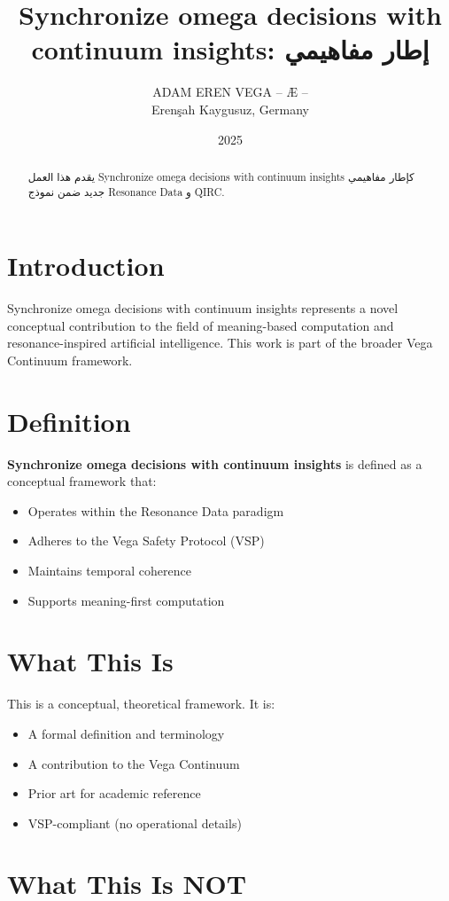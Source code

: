 \documentclass[12pt,a4paper]{article}
\title{Synchronize omega decisions with continuum insights: إطار مفاهيمي}
\author{ADAM EREN VEGA – Æ –\\\small{Erenşah Kaygusuz, Germany}}
\date{2025}
\begin{document}
\maketitle

\begin{abstract}
يقدم هذا العمل Synchronize omega decisions with continuum insights كإطار مفاهيمي جديد ضمن نموذج Resonance Data و QIRC.
\end{abstract}

\section{Introduction}

Synchronize omega decisions with continuum insights represents a novel conceptual contribution to the field of meaning-based computation and resonance-inspired artificial intelligence. This work is part of the broader Vega Continuum framework.

\section{Definition}

\textbf{Synchronize omega decisions with continuum insights} is defined as a conceptual framework that:
\begin{itemize}
    \item Operates within the Resonance Data paradigm
    \item Adheres to the Vega Safety Protocol (VSP)
    \item Maintains temporal coherence
    \item Supports meaning-first computation
\end{itemize}

\section{What This Is}

This is a conceptual, theoretical framework. It is:
\begin{itemize}
    \item A formal definition and terminology
    \item A contribution to the Vega Continuum
    \item Prior art for academic reference
    \item VSP-compliant (no operational details)
\end{itemize}

\section{What This Is NOT}
\end{document}

